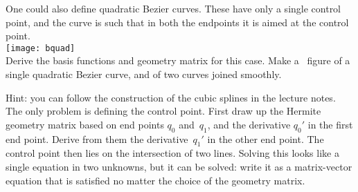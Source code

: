 One could also define quadratic Bezier curves. These have only a
single control point, and the curve is such that in both the endpoints
it is aimed at the control point.\\
\texttt{[image: bquad]}\\
Derive the basis functions and geometry matrix for this case.
Make a \gnuplot\ figure of a single quadratic Bezier curve, and of two
curves joined smoothly.

Hint: you can follow the construction of the cubic splines in the
lecture notes. The only
problem is defining the control point. First draw up the Hermite geometry matrix
based on end points $q_0$ and~$q_1$, and the derivative $q_0'$ in the
first end point. Derive from them the derivative~$q_1'$ in the other
end point. The control point then lies on the intersection of two
lines. Solving this looks like a single equation in two unknowns, but
it can be solved: write it as a matrix-vector equation that is
satisfied no matter the choice of the geometry matrix.
